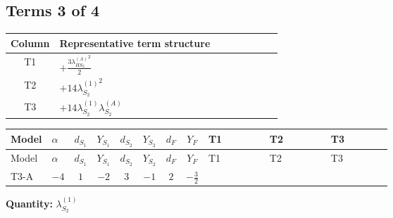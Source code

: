 \documentclass[8pt]{article}
\begin{document}
\begin{landscape}
\subsection*{Terms 3 of 4}
\begin{center}
\begin{tabular}{@{}c >{\raggedright\arraybackslash}p{0.82\linewidth}@{}}
\toprule
Column & Representative term structure \\
\midrule
T1 & \(\displaystyle +\frac{3 {\lambda_{HS_2}^{(A)}}^2}{2}\) \\
\midrule
T2 & \(\displaystyle +14 {\lambda_{S_2}^{(1)}}^2\) \\
\midrule
T3 & \(\displaystyle +14 {\lambda_{S_2}^{(1)}} {\lambda_{S_2}^{(A)}}\) \\
\midrule
\bottomrule
\end{tabular}
\end{center}
\smallskip
\tiny
\begin{longtable}{@{}llcccccc >{\raggedright\arraybackslash}p{0.21\linewidth} >{\raggedright\arraybackslash}p{0.21\linewidth} >{\raggedright\arraybackslash}p{0.21\linewidth}@{}}
\toprule
Model & $\alpha$ & $d_{S_1}$ & $Y_{S_1}$ & $d_{S_2}$ & $Y_{S_2}$ & $d_F$ & $Y_F$ & T1 & T2 & T3 \\
\midrule
\endfirsthead
\toprule
Model & $\alpha$ & $d_{S_1}$ & $Y_{S_1}$ & $d_{S_2}$ & $Y_{S_2}$ & $d_F$ & $Y_F$ & T1 & T2 & T3 \\
\midrule
\endhead
T3-A & $-4$ & $1$ & $-2$ & $3$ & $-1$ & $2$ & $-\frac{3}{2}$ & \scriptsize\adjustbox{max width=\linewidth}{$\begin{gathered} +\frac{3 {\lambda_{HS_2}^{(A)}}^2}{2}\end{gathered}$} & \scriptsize\adjustbox{max width=\linewidth}{$\begin{gathered} +14 {\lambda_{S_2}^{(1)}}^2\end{gathered}$} & \scriptsize\adjustbox{max width=\linewidth}{$\begin{gathered} +14 {\lambda_{S_2}^{(1)}} {\lambda_{S_2}^{(A)}}\end{gathered}$} \\
\midrule
\bottomrule
\end{longtable}
\clearpage
\noindent\textbf{Quantity: }$\lambda_{S_2}^{(1)}$\par\smallskip

\end{landscape}
\end{document}
